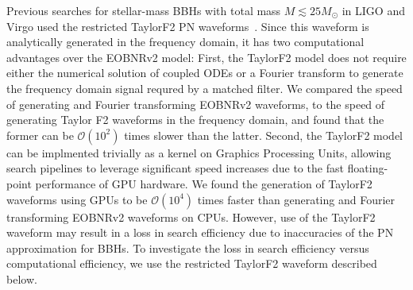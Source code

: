 Previous searches for stellar-mass BBHs  with total mass $M \lesssim 25
M_\odot$ in LIGO and Virgo used the restricted TaylorF2 PN
waveforms~\cite{Sathyaprakash:1991mt,Cutler:1994ys,Droz:1999qx}. Since this
waveform is analytically generated in the frequency domain, it has two
computational advantages over the EOBNRv2 model: First, the TaylorF2 model does not require
either the numerical solution of coupled ODEs or a Fourier transform to
generate the frequency domain signal requred by a matched filter. 
We compared the speed of generating and Fourier
transforming EOBNRv2 waveforms, to the speed of generating Taylor F2
waveforms in the frequency domain, and found that the former can be
$\mathcal{O}(10^2)$ times slower than the latter. Second, the TaylorF2 model can be implmented trivially as a
kernel on Graphics Processing Units, allowing search pipelines to leverage
significant speed increases due to the fast floating-point performance of
GPU hardware. We found the generation of TaylorF2 waveforms using GPUs to be
$\mathcal{O}(10^4)$ times faster than generating and Fourier
transforming EOBNRv2 waveforms on CPUs. However, use of the TaylorF2 waveform 
may result in a loss in search efficiency due to inaccuracies of the PN 
approximation for BBHs. To investigate the loss in search efficiency versus 
computational efficiency, we use the restricted TaylorF2 waveform described below.

